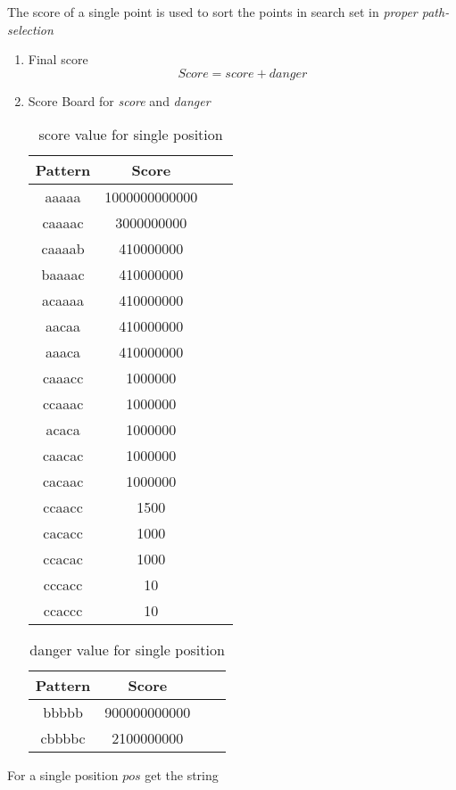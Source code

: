 \documentclass[conference]{IEEEtran}
\begin{document}
The score of a single point is used to sort the points in search set in \emph{proper path-selection}
\begin{enumerate}
	\item Final score
	$$Score = score + danger$$
	\item Score Board for \emph{score} and \emph{danger}
	
	\begin{table}[htb]
	\caption{score value for single position}
	\centering
    \begin{tabular}{cccc}
    \toprule
    Pattern&Score\\
    \midrule
	aaaaa&1000000000000\\
	caaaac&3000000000\\
	caaaab&410000000\\
    baaaac&410000000\\
    acaaaa&410000000\\
    aacaa&410000000\\
    aaaca&410000000\\
    caaacc&1000000\\
    ccaaac&1000000\\
    acaca&1000000\\
    caacac&1000000\\
    cacaac&1000000\\
    ccaacc&1500\\
    cacacc&1000\\
    ccacac&1000\\
    cccacc&10\\
    ccaccc&10\\    
	\bottomrule
	\end{tabular}
	\label{table:1}
	\end{table}
	

	\begin{table}[h]
	\caption{danger value for single position}
	\centering
    \begin{tabular}{cccc}
    \toprule
    Pattern&Score\\
    \midrule
	bbbbb&900000000000\\
	cbbbbc&2100000000\\
	\bottomrule
	\end{tabular}
	\label{table:1}
	\end{table}
	
\end{enumerate}
For a single position $pos$ get the string
\end{document}
